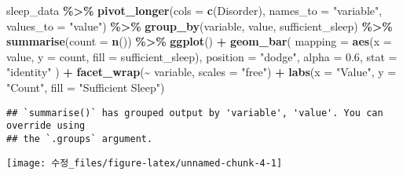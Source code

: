 \documentclass[
  11pt,
]{article}
\newenvironment{Shaded}{\begin{snugshade}}{\end{snugshade}}
\newcommand{\AttributeTok}[1]{\textcolor[rgb]{0.13,0.29,0.53}{#1}}
\newcommand{\FloatTok}[1]{\textcolor[rgb]{0.00,0.00,0.81}{#1}}
\newcommand{\FunctionTok}[1]{\textcolor[rgb]{0.13,0.29,0.53}{\textbf{#1}}}
\newcommand{\NormalTok}[1]{#1}
\newcommand{\SpecialCharTok}[1]{\textcolor[rgb]{0.81,0.36,0.00}{\textbf{#1}}}
\newcommand{\StringTok}[1]{\textcolor[rgb]{0.31,0.60,0.02}{#1}}
\begin{document}
\begin{Shaded}
\begin{Highlighting}[]
\NormalTok{sleep\_data }\SpecialCharTok{\%\textgreater{}\%}
  \FunctionTok{pivot\_longer}\NormalTok{(}\AttributeTok{cols =} \FunctionTok{c}\NormalTok{(Disorder), }\AttributeTok{names\_to =} \StringTok{"variable"}\NormalTok{, }\AttributeTok{values\_to =} \StringTok{"value"}\NormalTok{) }\SpecialCharTok{\%\textgreater{}\%}
  \FunctionTok{group\_by}\NormalTok{(variable, value, sufficient\_sleep) }\SpecialCharTok{\%\textgreater{}\%}
  \FunctionTok{summarise}\NormalTok{(}\AttributeTok{count =} \FunctionTok{n}\NormalTok{()) }\SpecialCharTok{\%\textgreater{}\%}
  \FunctionTok{ggplot}\NormalTok{() }\SpecialCharTok{+}
  \FunctionTok{geom\_bar}\NormalTok{(}
    \AttributeTok{mapping =} \FunctionTok{aes}\NormalTok{(}\AttributeTok{x =}\NormalTok{ value, }\AttributeTok{y =}\NormalTok{ count, }\AttributeTok{fill =}\NormalTok{ sufficient\_sleep),}
    \AttributeTok{position =} \StringTok{"dodge"}\NormalTok{,   }
    \AttributeTok{alpha =} \FloatTok{0.6}\NormalTok{,}
    \AttributeTok{stat =} \StringTok{"identity"}
\NormalTok{  ) }\SpecialCharTok{+}
  \FunctionTok{facet\_wrap}\NormalTok{(}\SpecialCharTok{\textasciitilde{}}\NormalTok{ variable, }\AttributeTok{scales =} \StringTok{"free"}\NormalTok{) }\SpecialCharTok{+}
  \FunctionTok{labs}\NormalTok{(}\AttributeTok{x =} \StringTok{"Value"}\NormalTok{, }\AttributeTok{y =} \StringTok{"Count"}\NormalTok{, }\AttributeTok{fill =} \StringTok{"Sufficient Sleep"}\NormalTok{)}
\end{Highlighting}
\end{Shaded}

\begin{verbatim}
## `summarise()` has grouped output by 'variable', 'value'. You can override using
## the `.groups` argument.
\end{verbatim}

\begin{center}\texttt{[image: 수정\_files/figure-latex/unnamed-chunk-4-1]} \end{center}
\end{document}
